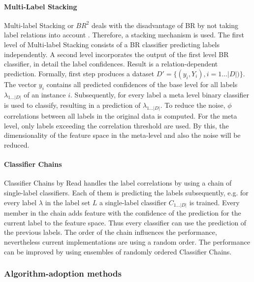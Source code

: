 					\paragraph{Multi-Label Stacking}
					\label{para:ms}
						Multi-label Stacking or $ BR^2 $ deals with the disadvantage of BR by not taking label relations into account \cite{Tsoumakas09}. Therefore, a stacking mechanism is used. The first level of Multi-label Stacking consists of a BR classifier predicting labels independently. A second level incorporates the output of the first level BR classifier, in detail the label confidences. Result is a relation-dependent prediction.	Formally, first step produces a dataset \mbox{$ D'=\{(y_i,Y_i),i=1\hdots |D|)\}$}. The vector $ y_i $ contains all predicted confidences of the base level for all labels $\lambda_{1\hdots |D|}$ of an instance $ i $. Subsequently, for every label a meta level binary classifier is used to classify, resulting in a prediction of $\lambda_{1\hdots |D|}$. To reduce the noise, $\phi$ correlations between all labels in the original data is computed. For the meta level, only labels exceeding the correlation threshold are used. By this, the dimensionality of the feature space in the meta-level and also the noise will be reduced.

					\paragraph{Classifier Chains}
					\label{para:cc}
						Classifier Chains by Read \etAl \cite{Read09} handles the label correlations by using a chain of single-label classifiers. Each of them is predicting the labels subsequently, e.g. for every label $ \lambda $ in the label set $ L $ a single-label classifier $C_{1\hdots |D|}$ is trained. Every member in the chain adds feature with the confidence of the prediction for the current label to the feature space. Thus every classifier can use the prediction of the previous labels. The order of the chain influences the performance, nevertheless current implementations are using a random order. The performance can be improved by using ensembles of randomly ordered Classifier Chains.

				\subsubsection{Algorithm-adoption methods}
				\label{subsubsec:adaption}

